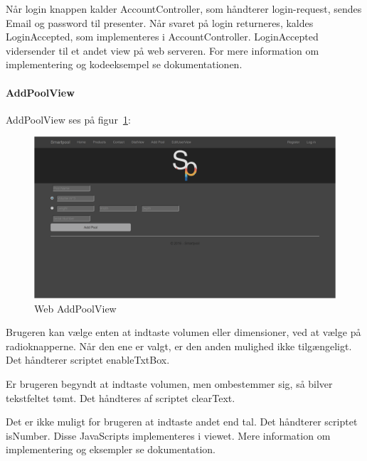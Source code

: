Når login knappen kalder AccountController, som håndterer login-request, sendes Email og password til presenter. Når svaret på login returneres, kaldes LoginAccepted, som implementeres i AccountController. LoginAccepted vidersender til et andet view på web serveren. For mere information om implementering og kodeeksempel se dokumentationen.

\paragraph{AddPoolView}
AddPoolView ses på figur~\ref{fig:webaddpoolview}:

\begin{figure}
	\centering
	\includegraphics[width=0.9\linewidth]{figs/implementering/web_addpoolview}
	\caption{Web AddPoolView}
	\label{fig:webaddpoolview}
\end{figure}

Brugeren kan vælge enten at indtaste volumen eller dimensioner, ved at vælge på radioknapperne. Når den ene er valgt, er den anden mulighed ikke tilgængeligt. Det håndterer scriptet enableTxtBox. 

Er brugeren begyndt at indtaste volumen, men ombestemmer sig, så bilver tekstfeltet tømt. Det håndteres af scriptet clearText. 

Det er ikke muligt for brugeren at indtaste andet end tal. Det håndterer scriptet isNumber. Disse JavaScripts implementeres i viewet. Mere information om implementering og eksempler se dokumentation.
